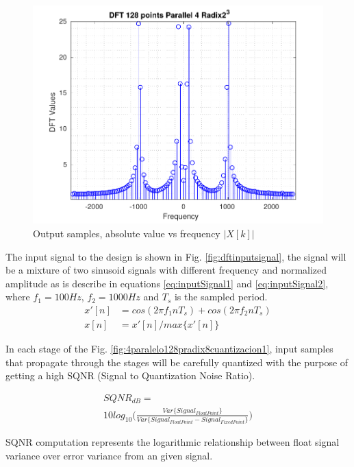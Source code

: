 \documentclass[journal,comsoc]{IEEEtran}
\begin{document}
\begin{figure}[ht!] 
	\centering
	\includegraphics[width=0.95\linewidth]{Diagramas/DftFixedPoint.pdf}
	\caption{Output samples, absolute value vs frequency $|X[k]|$}
	\label{fig:dftfixedpoint}
\end{figure}

The input signal to the design is shown in Fig. \ref{fig:dftinputsignal}, the signal  will be a mixture of two sinusoid signals with different frequency and normalized amplitude as is describe in equations \ref{eq:inputSignal1} and \ref{eq:inputSignal2}, where $f_1=100Hz$, $f_2=1000Hz$ and $T_s$ is the sampled period.
\begin{align}
x'[n] &= cos(2\pi f_1 n T_s) + cos(2\pi f_2 n T_s)\label{eq:inputSignal1}  \\
x[n] &= x'[n]/max\{x'[n]\} \label{eq:inputSignal2}						
\end{align}


In each stage of the Fig. \ref{fig:4paralelo128pradix8cuantizacion1}, input samples that propagate  through the stages will be carefully quantized with the purpose of getting a high SQNR (Signal to Quantization Noise Ratio).

\begin{equation}\label{eq:sqnr}
  \begin{multlined}
SQNR_{dB} =\\
10log_{10} \bigg(  \frac{  Var\{Signal_{FloatPoint}\}  }{  Var\{Signal_{FloatPoint} - Signal_{FixedPoint}\}}  \bigg)
 \end{multlined}
\end{equation}


SQNR computation represents the logarithmic relationship between float signal variance over error variance from an given signal.
\end{document}
